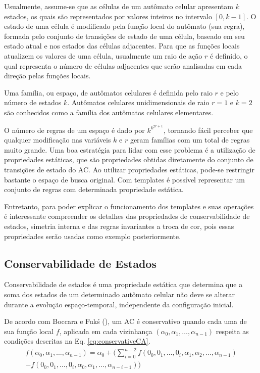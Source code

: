 \documentclass[12pt, a4paper]{article}
\begin{document}
Usualmente, assume-se que as células de um autômato celular apresentam $k$ estados, os quais são representados por valores inteiros no intervalo $[0, k-1]$. O estado de uma célula é modificado pela função local do autômato (sua regra), formada pelo conjunto de transições de estado de uma célula, baseado em seu estado atual e nos estados das células adjacentes. Para que as funções locais atualizem os valores de uma célula, usualmente um raio de ação $r$ é definido, o qual representa o número de células adjacentes que serão analisadas em cada direção pelas funções locais.

Uma família, ou espaço, de autômatos celulares é definida pelo raio $r$ e pelo número de estados $k$. Autômatos celulares unidimensionais de raio $r=1$ e $k=2$ são conhecidos como a família dos autômatos celulares elementares.

O número de regras de um espaço é dado por $k^{k^{2r+1}}$, tornando fácil perceber que qualquer modificação nas variáveis $k$ e $r$ geram famílias com um total de regras muito grande. Uma boa estratégia para lidar com esse problema é a utilização de propriedades estáticas, que são propriedades obtidas diretamente do conjunto de transições de estado do AC. Ao utilizar propriedades estáticas, pode-se restringir bastante o espaço de busca original. Com templates é possível representar um conjunto de regras com determinada propriedade estática.

Entretanto, para poder explicar o funcionamento dos templates e suas operações é interessante compreender os detalhes das propriedades de conservabilidade de estados, simetria interna e das regras invariantes a troca de cor, pois essas propriedades serão usadas como exemplo posteriormente.

\subsection{Conservabilidade de Estados}
Conservabilidade de estados é uma propriedade estática que determina que a soma dos estados de um determinado autômato celular não deve se alterar durante a evolução espaço-temporal, independente da configuração inicial.

De acordo com Boccara e Fukś (\citeyear{boccara2002}), um AC é conservativo quando cada uma de sua função local $f$, aplicada em cada vizinhança $(\alpha_0,\alpha_1, \dots, \alpha_{n-1})$ respeita as condições descritas na Eq. \eqref{eq:conservativeCA}.
\begin{equation}
\begin{split}
f(\alpha_0,\alpha_1, \dots,\alpha_{n-1}) = \alpha_0 + (\sum_{i=0}^{n-2}f(0_0,0_1, \dots,0_i,\alpha_1,\alpha_2, \dots,\alpha_{n-1}) \\- f(0_0,0_1, \dots,0_i,\alpha_0,\alpha_1, \dots,\alpha_{n-i-1}))
\label{eq:conservativeCA}
\end{split}
\end{equation}
\end{document}
